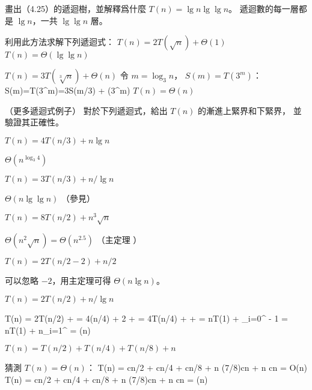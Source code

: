 \startitem
畫出（4.25）的遞迴樹，並解釋爲什麼 $T(n)=\lg n\lg\lg n$。
\stopitem
\startANSWER
遞迴數的每一層都是 $\lg n$，一共 $\lg\lg n$ 層。
\stopANSWER

利用此方法求解下列遞迴式：
\startitem
$T(n)=2T(\sqrt{n}) + \Theta(1)$
\stopitem
\startANSWER
$T(n)=\Theta(\lg\lg n)$
\stopANSWER

\startitem
$T(n)=3T(\sqrt[3]{n}) + \Theta(n)$
\stopitem
\startANSWER
令 $m=\log_3 n$， $S(m)=T(3^m)$：
\startformula
S(m)=T(3^m)=3S(m/3) + \Theta(3^m)
\stopformula
$T(n)=\Theta(n)$
\stopANSWER
\stopigBase
\stopPROBLEM

\startPROBLEM（更多遞迴式例子）
對於下列遞迴式，給出 $T(n)$ 的漸進上緊界和下緊界，
並驗證其正確性。
\startigBase[a]
\item $T(n) = 4T(n/3) + n\lg{n}$

\startANSWER
$\Theta(n^{\log_3 4})$
\stopANSWER

\item $T(n) = 3T(n/3) + n/\lg{n}$

\startANSWER
$\Theta(n \lg \lg n)$ （參見\initem[Tnlgn]）
\stopANSWER

\item $T(n) = 8T(n/2) + n^3\sqrt{n}$

\startANSWER
$\Theta(n^2\sqrt{n}) = \Theta(n^{2.5})$ \hfill（主定理 ）
\stopANSWER

\item $T(n) = 2T(n/2 - 2) + n/2$

\startANSWER
可以忽略 $-2$，用主定理可得 $\Theta(n\lg{n})$。
\stopANSWER

\item[item:Tnlgn] $T(n) = 2T(n/2) + n/\lg{n}$

\startANSWER
\startsplitformula\startmathalignment
\NC T(n) \NC= 2T(n/2) +  \NR
\NC      \NC= 4(n/4) + 2 +  \NR
\NC      \NC= 4T(n/4) +  +  \NR
\NC      \NC= nT(1) + \sum_{i=0}^{ - 1} \NR
\NC      \NC= nT(1) + n\sum_{i=1}^{} \NR
\NC      \NC= \Theta(n\lg{}) \NR
\stopmathalignment\stopsplitformula
\stopANSWER

\item $T(n) = T(n/2) + T(n/4) + T(n/8) + n$

\startANSWER
猜測 $T(n)=\Theta(n)$：
\startsplitformula\startmathalignment
\NC T(n) \NC = cn/2 + cn/4 + cn/8 + n \le (7/8)cn + n \le cn = O(n)  \NR
\NC T(n) \NC = cn/2 + cn/4 + cn/8 + n \ge (7/8)cn + n \ge cn = \Omega(n)  \NR
\stopmathalignment\stopsplitformula
\stopANSWER

